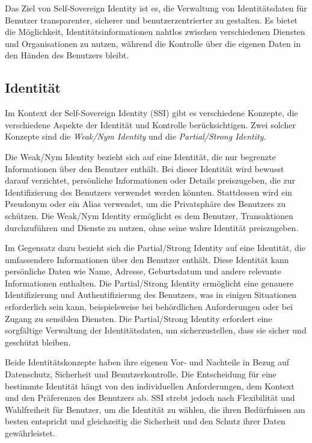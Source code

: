 	Das Ziel von Self-Sovereign Identity ist es, die Verwaltung von Identitätsdaten für Benutzer transparenter, sicherer und benutzerzentrierter zu gestalten. Es bietet die Möglichkeit, Identitätsinformationen nahtlos zwischen verschiedenen Diensten und Organisationen zu nutzen, während die Kontrolle über die eigenen Daten in den Händen des Benutzers bleibt.
	


\subsection{Identität}
Im Kontext der Self-Sovereign Identity (SSI) gibt es verschiedene Konzepte, die verschiedene Aspekte der Identität und Kontrolle berücksichtigen. Zwei solcher Konzepte sind die \textsl{Weak/Nym Identity} und die \textsl{Partial/Strong Identity}.

Die Weak/Nym Identity bezieht sich auf eine Identität, die nur begrenzte Informationen über den Benutzer enthält. Bei dieser Identität wird bewusst darauf verzichtet, persönliche Informationen oder Details preiszugeben, die zur Identifizierung des Benutzers verwendet werden könnten. Stattdessen wird ein Pseudonym oder ein Alias verwendet, um die Privatsphäre des Benutzers zu schützen. Die Weak/Nym Identity ermöglicht es dem Benutzer, Transaktionen durchzuführen und Dienste zu nutzen, ohne seine wahre Identität preiszugeben.

Im Gegensatz dazu bezieht sich die Partial/Strong Identity auf eine Identität, die umfassendere Informationen über den Benutzer enthält. Diese Identität kann persönliche Daten wie Name, Adresse, Geburtsdatum und andere relevante Informationen enthalten. Die Partial/Strong Identity ermöglicht eine genauere Identifizierung und Authentifizierung des Benutzers, was in einigen Situationen erforderlich sein kann, beispielsweise bei behördlichen Anforderungen oder bei Zugang zu sensiblen Diensten. Die Partial/Strong Identity erfordert eine sorgfältige Verwaltung der Identitätsdaten, um sicherzustellen, dass sie sicher und geschützt bleiben.

Beide Identitätskonzepte haben ihre eigenen Vor- und Nachteile in Bezug auf Datenschutz, Sicherheit und Benutzerkontrolle. Die Entscheidung für eine bestimmte Identität hängt von den individuellen Anforderungen, dem Kontext und den Präferenzen des Benutzers ab. SSI strebt jedoch nach Flexibilität und Wahlfreiheit für Benutzer, um die Identität zu wählen, die ihren Bedürfnissen am besten entspricht und gleichzeitig die Sicherheit und den Schutz ihrer Daten gewährleistet.

